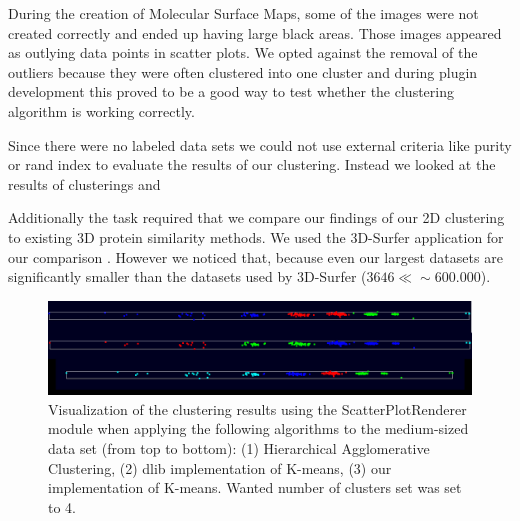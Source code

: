 \documentclass[journal]{vgtc}       %
\begin{document}
During the creation of Molecular Surface Maps, some of the images were not created correctly and ended up having  large  black areas. Those images appeared as outlying data points in scatter plots. We opted against the removal of the outliers because they were often clustered into one cluster and during plugin development this proved to be a good way to test whether the clustering algorithm is working correctly.

Since there were no labeled data sets we could not use external criteria like purity or rand index to evaluate the results of our clustering. Instead we looked at the results of clusterings and 

Additionally the task required that we compare our findings of our 2D clustering to existing 3D protein similarity methods.
We used the 3D-Surfer application for our comparison \cite{3dsurfer}. However we noticed  that, because even our largest datasets are significantly smaller than the datasets used by 3D-Surfer ($3646 \ll \sim 600.000$).







\begin{figure}[h!]
	\begin{center}
		\includegraphics[width= \linewidth]{plotMedium.png}
	\end{center}
	\caption{\label{fig:plot} Visualization of the clustering results using the ScatterPlotRenderer module when applying the following algorithms to the medium-sized data set (from top to bottom): (1) Hierarchical Agglomerative Clustering, (2) dlib implementation of K-means, (3) our implementation of K-means. Wanted number of clusters set was set to 4.}
\end{figure}
\end{document}
